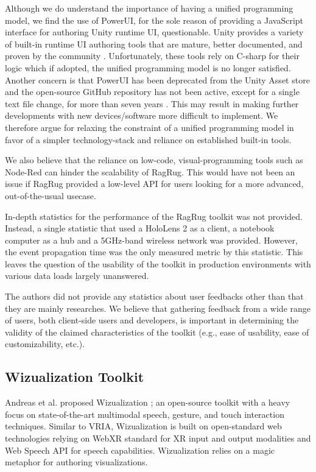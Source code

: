 \documentclass{vgtc}                          %
\begin{document}
\noindent Although we do understand the importance of having a unified programming model, we find the use of
PowerUI, for the sole reason of providing a JavaScript interface for authoring Unity runtime UI,
questionable. Unity provides a variety of built-in runtime UI authoring tools that are mature,
better documented, and proven by the community \cite{unity_ui_compairison}.
Unfortunately, these tools rely on C-sharp for their logic which if adopted, the unified programming model is
no longer satisfied. Another concern is that PowerUI has
been deprecated from the Unity Asset store and the open-source GitHub repository has not been active, except
for a single text file change, for more than seven years \cite{powerui}.
This may result in making further developments with new devices/software more difficult to implement.
We therefore argue for relaxing the constraint of a unified programming model in favor of a simpler 
technology-stack and reliance on established built-in tools.

\smallskip

\noindent We also believe that the reliance on low-code, visual-programming tools such as Node-Red can hinder
the scalability of RagRug. This would have not been an issue if RagRug provided a low-level API for users
looking for a more advanced, out-of-the-usual usecase.

\medskip

\noindent In-depth statistics for the performance of the RagRug toolkit was not provided. Instead, a single
statistic that used a HoloLens 2 as a client, a notebook computer as a hub and a 5GHz-band wireless network
was provided. However, the event propagation time was the only measured metric by this statistic.
This leaves the question of the usability of the toolkit in production environments with various data loads
largely unanswered.

\medskip

\noindent The authors did not provide any statistics about user feedbacks other than that they are mainly
researches. We believe that gathering feedback from a wide range of users, both client-side users and
developers, is important in determining the validity of the claimed characteristics of the toolkit (e.g.,
ease of usability, ease of customizability, etc.).

\subsection{Wizualization Toolkit}
\noindent Andreas et al. proposed Wizualization \cite{wizualization_toolkit}; an open-source \cite{wizualization:repo}
toolkit with a heavy focus on state-of-the-art multimodal speech, gesture, and touch interaction techniques.
Similar to VRIA, Wizualization is built on open-standard web technologies relying on WebXR standard for XR
input and output modalities and Web Speech API for speech capabilities. Wizualization relies on a magic
metaphor for authoring visualizations.
\end{document}
